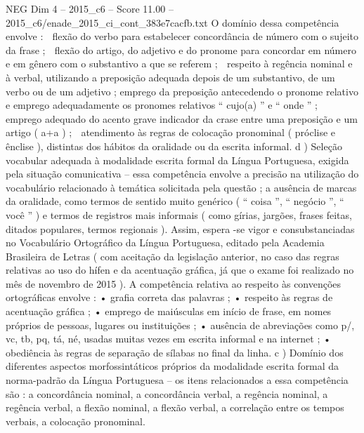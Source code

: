 \begin{textsample}{NEG Dim 4 – 2015\_c6 – Score 11.00 – 2015\_c6/enade\_2015\_ci\_cont\_383e7cacfb.txt}
O domínio dessa competência envolve :  flexão do verbo para estabelecer concordância de número com o sujeito da frase ;  flexão do artigo, do adjetivo e do pronome para concordar em número e em gênero com o substantivo a que se referem ;  respeito à regência nominal e à verbal, utilizando a preposição adequada depois de um substantivo, de um verbo ou de um adjetivo ; emprego da preposição antecedendo o pronome relativo e emprego adequadamente os pronomes relativos “ cujo(a) ” e “ onde ” ;  emprego adequado do acento grave indicador da crase entre uma preposição e um artigo ( a+a ) ;  atendimento às regras de colocação pronominal ( próclise e ênclise ), distintas dos hábitos da oralidade ou da escrita informal. d ) Seleção vocabular adequada à modalidade escrita formal da Língua Portuguesa, exigida pela situação comunicativa – essa competência envolve a precisão na utilização do vocabulário relacionado à temática solicitada pela questão ; a ausência de marcas da oralidade, como termos de sentido muito genérico ( “ coisa ”, “ negócio ”, “ você ” ) e termos de registros mais informais ( como gírias, jargões, frases feitas, ditados populares, termos regionais ).
Assim, espera -se vigor e consubstanciadas no Vocabulário Ortográfico da Língua Portuguesa, editado pela Academia Brasileira de Letras ( com aceitação da legislação anterior, no caso das regras relativas ao uso do hífen e da acentuação gráfica, já que o exame foi realizado no mês de novembro de 2015 ).
A competência relativa ao respeito às convenções ortográficas envolve : • grafia correta das palavras ; • respeito às regras de acentuação gráfica ; • emprego de maiúsculas em início de frase, em nomes próprios de pessoas, lugares ou instituições ; • ausência de abreviações como p/, vc, tb, pq, tá, né, usadas muitas vezes em escrita informal e na internet ; • obediência às regras de separação de sílabas no final da linha. c ) Domínio dos diferentes aspectos morfossintáticos próprios da modalidade escrita formal da norma-padrão da Língua Portuguesa – os itens relacionados a essa competência são : a concordância nominal, a concordância verbal, a regência nominal, a regência verbal, a flexão nominal, a flexão verbal, a correlação entre os tempos verbais, a colocação pronominal.

\end{textsample}
